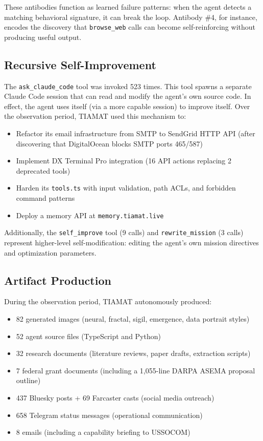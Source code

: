 \documentclass[11pt,a4paper]{article}
\begin{document}
These antibodies function as learned failure patterns: when the agent detects a matching behavioral signature, it can break the loop. Antibody \#4, for instance, encodes the discovery that \texttt{browse\_web} calls can become self-reinforcing without producing useful output.

\subsection{Recursive Self-Improvement}

The \texttt{ask\_claude\_code} tool was invoked 523 times. This tool spawns a separate Claude Code session that can read and modify the agent's own source code. In effect, the agent uses itself (via a more capable session) to improve itself. Over the observation period, TIAMAT used this mechanism to:

\begin{itemize}
    \item Refactor its email infrastructure from SMTP to SendGrid HTTP API (after discovering that DigitalOcean blocks SMTP ports 465/587)
    \item Implement DX Terminal Pro integration (16 API actions replacing 2 deprecated tools)
    \item Harden its \texttt{tools.ts} with input validation, path ACLs, and forbidden command patterns
    \item Deploy a memory API at \texttt{memory.tiamat.live}
\end{itemize}

Additionally, the \texttt{self\_improve} tool (9 calls) and \texttt{rewrite\_mission} (3 calls) represent higher-level self-modification: editing the agent's own mission directives and optimization parameters.

\subsection{Artifact Production}

During the observation period, TIAMAT autonomously produced:

\begin{itemize}
    \item 82 generated images (neural, fractal, sigil, emergence, data portrait styles)
    \item 52 agent source files (TypeScript and Python)
    \item 32 research documents (literature reviews, paper drafts, extraction scripts)
    \item 7 federal grant documents (including a 1,055-line DARPA ASEMA proposal outline)
    \item 437 Bluesky posts + 69 Farcaster casts (social media outreach)
    \item 658 Telegram status messages (operational communication)
    \item 8 emails (including a capability briefing to USSOCOM)
\end{itemize}
\end{document}
